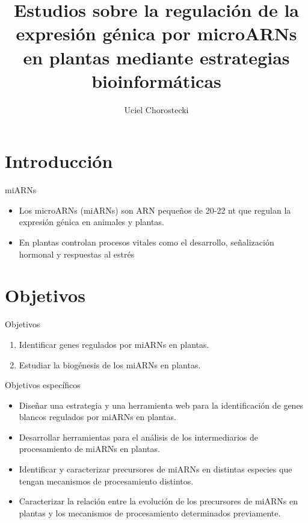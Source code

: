 \documentclass{beamer}
\title[]{Estudios sobre la regulación de la expresión génica por microARNs en plantas mediante estrategias bioinformáticas}
\author{Uciel Chorostecki}
\institute[IBR]{ \\Director Dr. Javier Palatnik\\Instituto Biología Molecular y Celular Rosario}
\date{}
\begin{document}
\frame{\titlepage}

\section{Introducción}

\begin{frame}{miARNs}
    \begin{itemize}
        \item Los microARNs (miARNs) son ARN pequeños de 20-22 nt que regulan la expresión génica en animales y plantas. 
        \item En plantas controlan procesos vitales como el desarrollo, señalización hormonal y respuestas al estrés
    \end{itemize}
\end{frame}

\section{Objetivos}

\begin{frame}{Objetivos}
	\begin{enumerate}[<+->]
        \item Identificar genes regulados por miARNs en plantas.
        \item Estudiar la biogénesis de los miARNs en plantas.
	\end{enumerate}
\end{frame}

\begin{frame}{Objetivos específicos}
		\pause
		\begin{itemize}
            \item<-2> Diseñar una estrategia y una herramienta web para la identificación de genes blancos regulados por miARNs en plantas.
			\item<-1> Desarrollar herramientas para el análisis de los intermediarios de procesamiento de miARNs en plantas.
			\item<-1> Identificar y caracterizar precursores de miARNs en distintas especies que tengan mecanismos de procesamiento distintos.
			\item<-1> Caracterizar la relación entre la evolución de los precursores de miARNs en plantas y los mecanismos de procesamiento determinados previamente.
        \end{itemize}
\end{frame}
\end{document}
